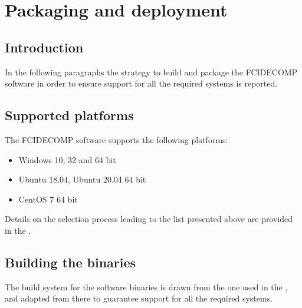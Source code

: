 \documentclass[a4paper,10pt,english]{sphinxmanual}
\begin{document}
\chapter{Packaging and deployment}
\label{\detokenize{packaging_and_deployment:packaging-and-deployment}}\label{\detokenize{packaging_and_deployment::doc}}

\section{Introduction}
\label{\detokenize{packaging_and_deployment:introduction}}
\sphinxAtStartPar
In the following paragraphs the strategy to build and package the FCIDECOMP software in order to ensure
support for all the required systems is reported.


\section{Supported platforms}
\label{\detokenize{packaging_and_deployment:supported-platforms}}\label{\detokenize{packaging_and_deployment:id1}}
\sphinxAtStartPar
The FCIDECOMP software supports the following platforms:
\begin{itemize}
\item {} 
\sphinxAtStartPar
Windows 10, 32 and 64 bit

\item {} 
\sphinxAtStartPar
Ubuntu 18.04, Ubuntu 20.04 64 bit

\item {} 
\sphinxAtStartPar
CentOS 7 64 bit

\end{itemize}

\sphinxAtStartPar
Details on the selection process leading to the list presented above are provided in the
{\hyperref[\detokenize{a_design_justifications:design-justifications}]{}}.


\section{Building the binaries}
\label{\detokenize{packaging_and_deployment:building-the-binaries}}
\sphinxAtStartPar
The build system for the software binaries is drawn from the one used in the
{\hyperref[\detokenize{introduction:fcidecomp-latest}]{}}, and adapted from there to guarantee support for all the
required systems.
\end{document}
